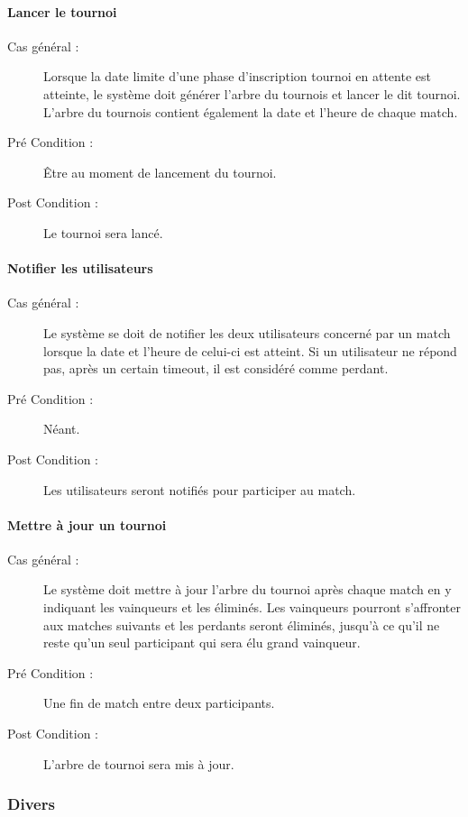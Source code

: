 \documentclass[a4paper]{article}
\begin{document}
\paragraph{Lancer le tournoi}
\begin{description}
\item[Cas général :] Lorsque la date limite d'une phase d'inscription tournoi en attente est atteinte, le système doit générer l'arbre du tournois et lancer le dit tournoi. L'arbre du tournois contient également la date et l'heure de chaque match.
\item[Pré Condition  :] Être au moment de lancement du tournoi.
\item[Post Condition :] Le tournoi sera lancé.
\end{description}

\paragraph{Notifier les utilisateurs}
\begin{description}
\item[Cas général :] Le système se doit de notifier les deux \glspl{utilisateur} concerné par un match lorsque la date et l'heure de celui-ci est atteint. Si un \gls{utilisateur} ne répond pas, après un certain timeout, il est considéré comme perdant.
\item[Pré Condition  :] Néant.
\item[Post Condition :] Les utilisateurs seront notifiés pour participer au match.
\end{description}

\paragraph{Mettre à jour un tournoi}
\begin{description}
\item[Cas général :] Le système doit mettre à jour l'arbre du tournoi après chaque match en y indiquant les vainqueurs et les éliminés. Les vainqueurs pourront s'affronter aux matches suivants et les perdants seront éliminés, jusqu'à ce qu'il ne reste qu'un seul participant qui sera élu grand vainqueur.
\item[Pré Condition  :] Une fin de match entre deux participants.
\item[Post Condition :] L'arbre de tournoi sera mis à jour.
\end{description}

\subsubsection{Divers}
\end{document}
